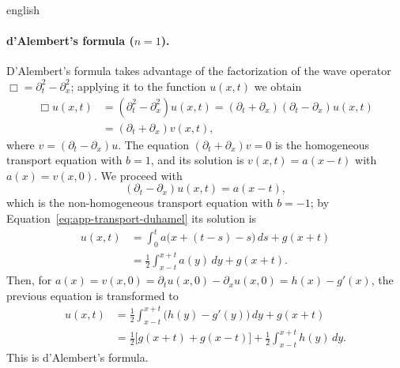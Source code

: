 \documentclass[../0000.tex]{subfiles}
\begin{document}
\begin{hyphenrules}{english}
\paragraph{d'Alembert's formula ($n=1$).}
D'Alembert's formula takes advantage of the factorization of the wave operator
$\Box=\partial_t^2-\partial_x^2$; applying it to the function $u(x,t)$ we obtain
\begin{align}
  \Box u(x,t)&=(\partial_t^2-\partial_x^2)u(x,t)=(\partial_t+\partial_x)(\partial_t-\partial_x)u(x,t) \label{eq:dalembert-1}\\
             &=(\partial_t+\partial_x)v(x,t), \label{eq:dalembert-2}
\end{align}
where $v=(\partial_t-\partial_x)u$. The equation $(\partial_t+\partial_x)v=0$ is the homogeneous
transport equation with $b=1$, and its solution is $v(x,t)=a(x-t)$ with $a(x)=v(x,0)$. We proceed with
\begin{equation}
  (\partial_t-\partial_x)u(x,t)=a(x-t),
  \label{eq:dalembert-3}
\end{equation}
which is the non-homogeneous transport equation with $b=-1$; by Equation~\eqref{eq:app-transport-duhamel} its
solution is
\begin{align}
  u(x,t)&=\int_0^t a\big(x+(t-s)-s\big)\,d s+g(x+t) \label{eq:dalembert-4}\\
        &=\frac12\int_{x-t}^{x+t}a(y)\,d y+g(x+t). \label{eq:dalembert-5}
\end{align}
Then, for $a(x)=v(x,0)=\partial_t u(x,0)-\partial_x u(x,0)=h(x)-g'(x)$, the previous equation is
transformed to
\begin{align}
  u(x,t)&=\frac12\int_{x-t}^{x+t}\big(h(y)-g'(y)\big)\,d y+g(x+t) \label{eq:dalembert-6}\\
        &=\frac12\big[g(x+t)+g(x-t)\big]+\frac12\int_{x-t}^{x+t}h(y)\,d y. \label{eq:app-dalembert}
\end{align}
This is d'Alembert's formula.


\end{hyphenrules}
\end{document}
